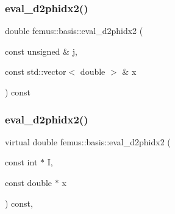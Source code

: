 \mbox{\label{classfemus_1_1basis_af8e2384b8327ce9890851e3ae6447853}} 
\subsubsection{\texorpdfstring{eval\+\_\+d2phidx2()}{eval\_d2phidx2()}\hspace{0.1cm}{\footnotesize\ttfamily [1/2]}}
{\footnotesize\ttfamily double femus\+::basis\+::eval\+\_\+d2phidx2 (\begin{DoxyParamCaption}\item[{const unsigned \&}]{j,  }\item[{const std\+::vector$<$ double $>$ \&}]{x }\end{DoxyParamCaption}) const\hspace{0.3cm}{\ttfamily [inline]}}

\mbox{\label{classfemus_1_1basis_a0a9839e75d1c9c8302486fc072eed028}} 
\subsubsection{\texorpdfstring{eval\+\_\+d2phidx2()}{eval\_d2phidx2()}\hspace{0.1cm}{\footnotesize\ttfamily [2/2]}}
{\footnotesize\ttfamily virtual double femus\+::basis\+::eval\+\_\+d2phidx2 (\begin{DoxyParamCaption}\item[{const int $\ast$}]{I,  }\item[{const double $\ast$}]{x }\end{DoxyParamCaption}) const\hspace{0.3cm}{\ttfamily [inline]}, {\ttfamily [virtual]}}



